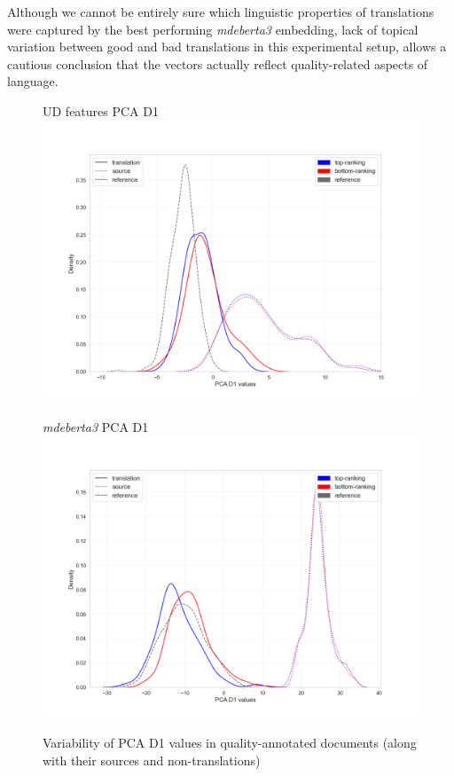Although we cannot be entirely sure which linguistic properties of translations were captured by the best performing \textit{mdeberta3} embedding, lack of topical variation between good and bad translations in this experimental setup, allows a cautious conclusion that the vectors actually reflect quality-related aspects of language. 

\begin{figure}[H]
	\begin{minipage}[c]{0.5\linewidth}
		\centering
		UD features PCA D1
		\includegraphics[width=\linewidth]{figures/pca/src-qua-ttype-ud-PCA-D1-lines}
	\end{minipage}	
	\begin{minipage}[c]{0.5\linewidth}
		\centering
		\textit{mdeberta3} PCA D1
		\includegraphics[width=\linewidth]{figures/pca/src-qua-ttype-mdeberta3-base-PCA-D1-lines}
	\end{minipage}
	\caption{\label{fig:pca_qua}Variability of PCA D1 values in quality-annotated documents (along with their sources and non-translations)}	
\end{figure}   

